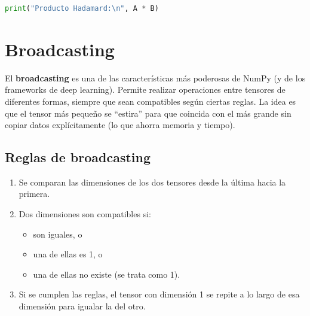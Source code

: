 \documentclass[12pt,a4paper,openany,oneside]{book}
\begin{document}
\begin{lstlisting}[language=Python]
print("Producto Hadamard:\n", A * B)
\end{lstlisting}

\begin{center}
\end{center}

\section{Broadcasting}

El \textbf{broadcasting} es una de las características más poderosas de NumPy (y de los frameworks de deep learning). Permite realizar operaciones entre tensores de diferentes formas, siempre que sean compatibles según ciertas reglas. La idea es que el tensor más pequeño se ``estira'' para que coincida con el más grande sin copiar datos explícitamente (lo que ahorra memoria y tiempo).

\subsection{Reglas de broadcasting}
\begin{enumerate}
    \item Se comparan las dimensiones de los dos tensores desde la última hacia la primera.
    \item Dos dimensiones son compatibles si:
        \begin{itemize}
            \item son iguales, o
            \item una de ellas es 1, o
            \item una de ellas no existe (se trata como 1).
        \end{itemize}
    \item Si se cumplen las reglas, el tensor con dimensión 1 se repite a lo largo de esa dimensión para igualar la del otro.
\end{enumerate}
\end{document}
